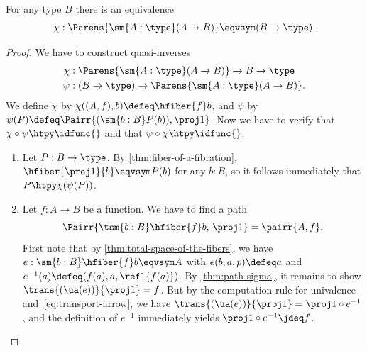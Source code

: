 %
\begin{thm}\label{thm:nobject-classifier-appetizer}
For any type $B$ there is an equivalence
\begin{equation*}
\chi:\Parens{\sm{A:\type} (A\to B)}\eqvsym (B\to\type).
\end{equation*}
\end{thm}

\begin{proof}
We have to construct quasi-inverses
\begin{align*}
\chi & : \Parens{\sm{A:\type} (A\to B)}\to B\to\type\\
\psi & : (B\to\type)\to\Parens{\sm{A:\type} (A\to B)}.
\end{align*}
We define $\chi$ by $\chi((A,f),b)\defeq\hfiber{f}b$, and $\psi$ by $\psi(P)\defeq\Pairr{(\sm{b:B} P(b)),\proj1}$.
Now we have to verify that $\chi\circ\psi\htpy\idfunc{}$ and that $\psi\circ\chi \htpy\idfunc{}$.
\begin{enumerate}
\item Let $P:B\to\type$.
  By \cref{thm:fiber-of-a-fibration},
$\hfiber{\proj1}{b}\eqvsym P(b)$ for any $b:B$, so it follows immediately
that $P\htpy\chi(\psi(P))$.
\item Let $f:A\to B$ be a function. We have to find a path
\begin{equation*}
\Pairr{\tsm{b:B} \hfiber{f}b,\,\proj1}=\pairr{A,f}.
\end{equation*}
First note that by \cref{thm:total-space-of-the-fibers}, we have
$e:\sm{b:B} \hfiber{f}b\eqvsym A$ with $e(b,a,p)\defeq a$ and $e^{-1}(a)
\defeq(f(a),a,\refl{f(a)})$.
By \cref{thm:path-sigma}, it remains to show $\trans{(\ua(e))}{\proj1} = f$.
But by the computation rule for univalence and~\eqref{eq:transport-arrow}, we have $\trans{(\ua(e))}{\proj1} = \proj1\circ e^{-1}$, and the definition of $e^{-1}$ immediately yields $\proj1 \circ e^{-1} \jdeq f$.\qedhere
\end{enumerate}
\end{proof}
